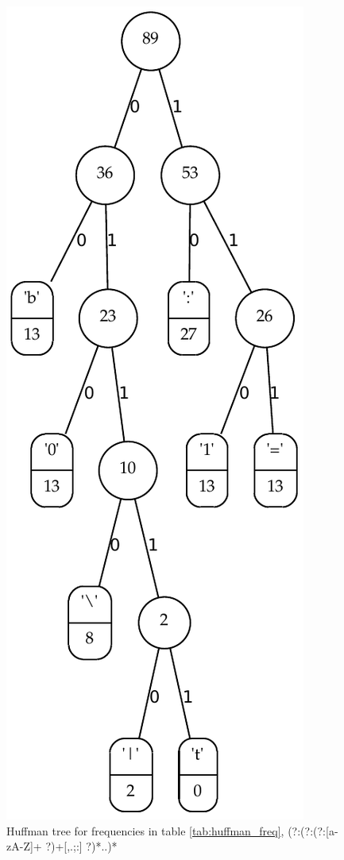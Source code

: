 \begin{figure}
  \centering
  \includegraphics{optimizations/huffman.pdf}
  \caption{Huffman tree for frequencies in table
    \ref{tab:huffman_freq}, \textsf{(?:(?:(?:[a-zA-Z]+ ?)+[,.;:] ?)*..)*}}
  \label{fig:huffman2}
\end{figure}

